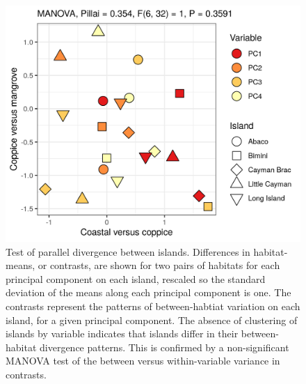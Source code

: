 \begin{figure}[H]
	\centering
	\includegraphics[width=\textwidth]{"../analyses/09-parallelism/figure_contrasts"}
	\caption{Test of parallel divergence between islands. Differences in habitat-means, or contrasts, are shown for two pairs of habitats for each principal component on each island, rescaled so the standard deviation of the means along each principal component is one. The contrasts represent the patterns of between-habtiat variation on each island, for a given principal component. The absence of clustering of islands by variable indicates that islands differ in their between-habitat divergence patterns. This is confirmed by a non-significant MANOVA test of the between versus within-variable variance in contrasts.}
	\label{supfig:contrasts}
\end{figure}